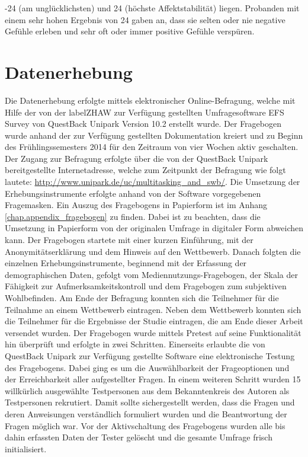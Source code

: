 -24 (am unglücklichsten) und 24 (höchste Affektstabilität) liegen. Probanden mit einem sehr hohen Ergebnis von 24 gaben an, dass sie selten oder nie negative Gefühle erleben und sehr oft oder immer positive Gefühle verspüren.

\section{Datenerhebung}\label{section.datenerhebung}
Die Datenerhebung erfolgte mittels elektronischer Online-Befragung, welche mit Hilfe der von der \gls{labelZHAW} zur Verfügung gestellten Umfragesoftware EFS Survey von QuestBack Unipark Version 10.2 erstellt wurde. Der Fragebogen wurde anhand der zur Verfügung gestellten Dokumentation kreiert \cite{QuestBack2014} und zu Beginn des Frühlingssemesters 2014 für den Zeitraum von vier Wochen aktiv geschalten. Der Zugang zur Befragung erfolgte über die von der QuestBack Unipark bereitgestellte Internetadresse, welche zum Zeitpunkt der Befragung wie folgt lautete: \url{http://www.unipark.de/uc/multitasking_and_swb/}. Die Umsetzung der Erhebungsinstrumente erfolgte anhand von der Software vorgegebenen Fragemasken. Ein Auszug des Fragebogens in Papierform ist im Anhang \ref{chap.appendix_fragebogen} zu finden. Dabei ist zu beachten, dass die Umsetzung in Papierform von der originalen Umfrage in digitaler Form abweichen kann. Der Fragebogen startete mit einer kurzen Einführung, mit der Anonymitätserklärung und dem Hinweis auf den Wettbewerb. Danach folgten die einzelnen Erhebungsinstrumente, beginnend mit der Erfassung der demographischen Daten, gefolgt vom Mediennutzungs-Fragebogen, der Skala der Fähigkeit zur Aufmerksamkeitskontroll und dem Fragebogen zum subjektiven Wohlbefinden. Am Ende der Befragung konnten sich die Teilnehmer für die Teilnahme an einem Wettbewerb eintragen. Neben dem Wettbewerb konnten sich die Teilnehmer für die Ergebnisse der Studie eintragen, die am Ende dieser Arbeit versendet wurden. Der Fragebogen wurde mittels Pretest auf seine Funktionalität hin überprüft und erfolgte in zwei Schritten. Einerseits erlaubte die von QuestBack Unipark zur Verfügung gestellte Software eine elektronische Testung des Fragebogens. Dabei ging es um die Auswählbarkeit der Frageoptionen und der Erreichbarkeit aller aufgestellter Fragen. In einem weiteren Schritt wurden 15 willkürlich ausgewählte Testpersonen aus dem Bekanntenkreis des Autoren als Testpersonen rekrutiert. Damit sollte sichergestellt werden, dass die Fragen und deren Anweisungen verständlich formuliert wurden und die Beantwortung der Fragen möglich war. Vor der Aktivschaltung des Fragebogens wurden alle bis dahin erfassten Daten der Tester gelöscht und die gesamte Umfrage frisch initialisiert. 

